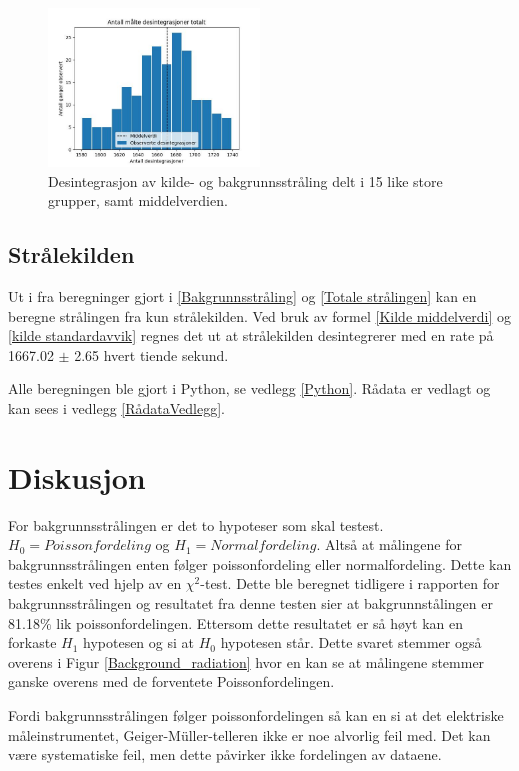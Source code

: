 \documentclass[twocolumn, 11pt]{article} %
\begin{document}
\begin{figure}[ht]
\includegraphics[width=0.5\textwidth]{images/Total_radiation.jpg}
\caption{Desintegrasjon av kilde- og bakgrunnsstråling delt i 15 like store grupper, samt middelverdien.}
\label{Total_radiation}
\end{figure}


\subsection{Strålekilden}
Ut i fra beregninger gjort i \ref{Bakgrunnsstråling} og \ref{Totale strålingen} kan en beregne strålingen fra kun strålekilden. Ved bruk av formel \eqref{Kilde middelverdi} og \eqref{kilde standardavvik} regnes det ut at strålekilden desintegrerer med en rate på 1667.02 $\pm$ 2.65 hvert tiende sekund.
\bigskip

Alle beregningen ble gjort i Python, se vedlegg \ref{Python}.
Rådata er vedlagt og kan sees i vedlegg \ref{RådataVedlegg}.


\section{Diskusjon}

For bakgrunnsstrålingen er det to hypoteser som skal testest. \textit{$H_0 = Poissonfordeling$} og \textit{$H_1 = Normalfordeling$}. Altså at målingene for bakgrunnsstrålingen enten følger poissonfordeling eller normalfordeling. Dette kan testes enkelt ved hjelp av en \textit{$\chi^2$}-test.
Dette ble beregnet tidligere i rapporten for bakgrunnsstrålingen og resultatet fra denne testen sier at bakgrunnstålingen er 81.18$\%$ lik poissonfordelingen. Ettersom dette resultatet er så høyt kan en forkaste \textit{$H_1$} hypotesen og si at \textit{$H_0$} hypotesen står. Dette svaret stemmer også overens i Figur \ref{Background_radiation} hvor en kan se at målingene stemmer ganske overens med de forventete Poissonfordelingen.

Fordi bakgrunnsstrålingen følger poissonfordelingen så kan en si at det elektriske måleinstrumentet, Geiger-Müller-telleren ikke er noe alvorlig feil med. Det kan være systematiske feil, men dette påvirker ikke fordelingen av dataene.
\end{document}

